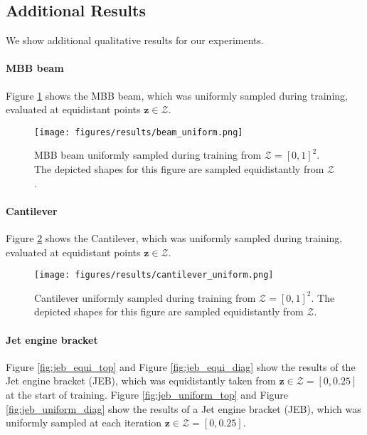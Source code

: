 \FloatBarrier

\subsection{Additional Results}
We show additional qualitative results for our experiments.

\paragraph{MBB beam}
Figure \ref{fig:beam_uniform} shows the MBB beam, which was uniformly sampled during training, evaluated at equidistant points $\mathbf{z} \in \mathcal{Z}$.

\begin{figure}
    \centering
    \texttt{[image: figures/results/beam\_uniform.png]}
    \caption{MBB beam uniformly sampled during training from $\mathcal{Z} = [0,1]^2$. The depicted shapes for this figure are sampled equidistantly from $\mathcal{Z}$.}
    \label{fig:beam_uniform}
\end{figure}

\paragraph{Cantilever}
Figure \ref{fig:cantilever_uniform} shows the Cantilever, which was  uniformly sampled during training, evaluated at equidistant points $\mathbf{z} \in \mathcal{Z}$.


\begin{figure}
    \centering
    \texttt{[image: figures/results/cantilever\_uniform.png]}
    \caption{
    Cantilever uniformly sampled during training from $\mathcal{Z} = [0,1]^2$. The depicted shapes for this figure are sampled equidistantly from $\mathcal{Z}$.
    }
    \label{fig:cantilever_uniform}
\end{figure}


\paragraph{Jet engine bracket}
Figure \ref{fig:jeb_equi_top} and Figure \ref{fig:jeb_equi_diag} show the results of the Jet engine bracket (JEB), which was equidistantly taken from $\mathbf{z} \in \mathcal{Z} = [0,0.25]$ at the start of training.
Figure \ref{fig:jeb_uniform_top} and Figure \ref{fig:jeb_uniform_diag} show the results of a Jet engine bracket (JEB), which was uniformly sampled at each iteration $\mathbf{z} \in \mathcal{Z} = [0,0.25]$.

